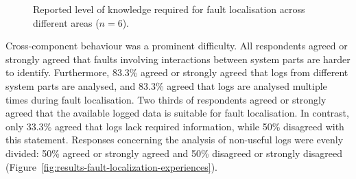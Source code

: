 \begin{figure}[H]
{
    }
    \caption{Reported level of knowledge required for fault localisation
    across different areas ($n=6$).}
    \label{fig:results-fault-localization-knowledge}
\end{figure}


Cross-component behaviour was a prominent difficulty. All respondents agreed or
strongly agreed that faults involving interactions between system parts are harder to
identify. Furthermore, 83.3\% agreed or strongly agreed that logs from different
system parts are analysed, and 83.3\% agreed that logs are analysed multiple times
during fault localisation. Two thirds of respondents agreed or strongly agreed that
the available logged data is suitable for fault localisation. In contrast, only
33.3\% agreed that logs lack required information, while 50\% disagreed with this
statement. Responses concerning the analysis of non-useful logs were evenly divided:
50\% agreed or strongly agreed and 50\% disagreed or strongly disagreed
(Figure~\ref{fig:results-fault-localization-experiences}).

